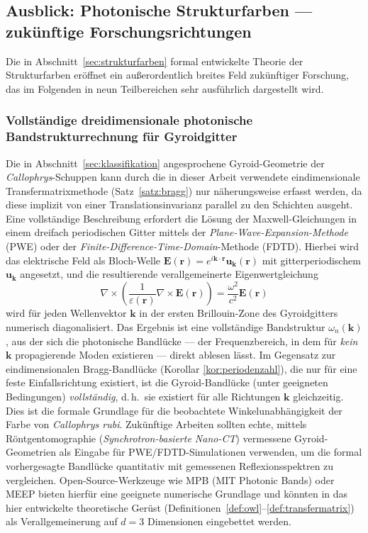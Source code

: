 ﻿\documentclass[a4paper,12pt]{article}
\theoremstyle{definition}
\begin{document}
	\subsection{Ausblick: Photonische Strukturfarben --- zukünftige Forschungsrichtungen}
	\label{sec:ausblick_struktur}

	Die in Abschnitt~\ref{sec:strukturfarben} formal entwickelte Theorie der
	Strukturfarben eröffnet ein außerordentlich breites Feld zukünftiger
	Forschung, das im Folgenden in neun Teilbereichen sehr ausführlich
	dargestellt wird.

	\subsubsection{Vollständige dreidimensionale photonische Bandstrukturrechnung für Gyroidgitter}

	Die in Abschnitt~\ref{sec:klassifikation} angesprochene Gyroid-Geometrie
	der \textit{Callophrys}-Schuppen kann durch die in dieser Arbeit
	verwendete eindimensionale Transfermatrixmethode (Satz~\ref{satz:bragg})
	nur näherungsweise erfasst werden, da diese implizit von einer
	Translationsinvarianz parallel zu den Schichten ausgeht. Eine
	vollständige Beschreibung erfordert die Lösung der
	Maxwell-Gleichungen in einem dreifach periodischen Gitter mittels der
	\emph{Plane-Wave-Expansion-Methode} (PWE) oder der
	\emph{Finite-Difference-Time-Domain}-Methode (FDTD). Hierbei wird das
	elektrische Feld als Bloch-Welle
	$\mathbf{E}(\mathbf{r}) = e^{i\mathbf{k}\cdot\mathbf{r}}
	\mathbf{u}_{\mathbf{k}}(\mathbf{r})$ mit gitterperiodischem
	$\mathbf{u}_{\mathbf{k}}$ angesetzt, und die resultierende
	verallgemeinerte Eigenwertgleichung
	\[
	\nabla\times\left(\frac{1}{\varepsilon(\mathbf{r})}\nabla\times
	\mathbf{E}(\mathbf{r})\right) = \frac{\omega^2}{c^2}\mathbf{E}(\mathbf{r})
	\]
	wird für jeden Wellenvektor $\mathbf{k}$ in der ersten Brillouin-Zone
	des Gyroidgitters numerisch diagonalisiert. Das Ergebnis ist eine
	vollständige Bandstruktur $\omega_n(\mathbf{k})$, aus der sich die
	photonische Bandlücke --- der Frequenzbereich, in dem für \emph{kein}
	$\mathbf{k}$ propagierende Moden existieren --- direkt ablesen lässt.
	Im Gegensatz zur eindimensionalen Bragg-Bandlücke (Korollar
	\ref{kor:periodenzahl}), die nur für eine feste Einfallsrichtung
	existiert, ist die Gyroid-Bandlücke (unter geeigneten Bedingungen)
	\emph{vollständig}, d.\,h.\ sie existiert für alle Richtungen
	$\mathbf{k}$ gleichzeitig. Dies ist die formale Grundlage für die
	beobachtete Winkelunabhängigkeit der Farbe von \textit{Callophrys
		rubi}. Zukünftige Arbeiten sollten echte, mittels
	Röntgentomographie (\textit{Synchrotron-basierte Nano-CT}) vermessene
	Gyroid-Geometrien als Eingabe für PWE/FDTD-Simulationen verwenden, um
	die formal vorhergesagte Bandlücke quantitativ mit gemessenen
	Reflexionsspektren zu vergleichen. Open-Source-Werkzeuge wie MPB (MIT
	Photonic Bands) oder MEEP bieten hierfür eine geeignete numerische
	Grundlage und könnten in das hier entwickelte theoretische Gerüst
	(Definitionen~\ref{def:owl}--\ref{def:transfermatrix}) als
	Verallgemeinerung auf $d=3$ Dimensionen eingebettet werden.
\end{document}
